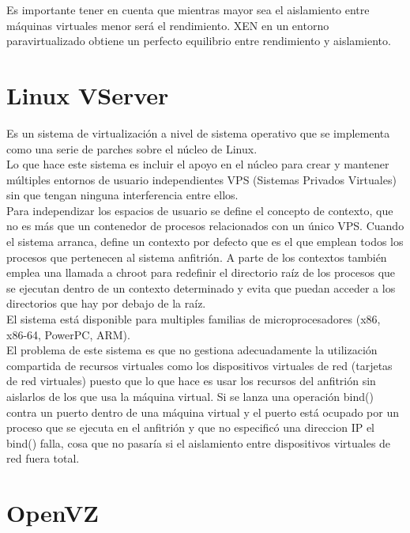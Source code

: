 \documentclass[10pt,a4paper,spanish]{report}
\begin{document}
  \noindent
  Es importante tener en cuenta que mientras mayor sea el aislamiento entre máquinas virtuales menor será el rendimiento. XEN en un entorno paravirtualizado obtiene un perfecto equilibrio entre rendimiento y aislamiento.

  \newpage
  \section{Linux VServer}

  \noindent
  Es un sistema de virtualización a nivel de sistema operativo que se implementa como una serie de parches sobre el núcleo de Linux. \\

  \noindent
  Lo que hace este sistema es incluir el apoyo en el núcleo para crear y mantener múltiples entornos de usuario independientes VPS (Sistemas Privados Virtuales) sin que tengan ninguna interferencia entre ellos. \\

  \noindent
  Para independizar los espacios de usuario se define el concepto de contexto, que no es más que un contenedor de procesos relacionados con un único VPS. Cuando el sistema arranca, define un contexto por defecto que es el que emplean todos los procesos que pertenecen al sistema anfitrión. A parte de los contextos también emplea una llamada a chroot para redefinir el directorio raíz de los procesos que se ejecutan dentro de un contexto determinado y evita que puedan acceder a los directorios que hay por debajo de la raíz. \\

  \noindent
  El sistema está disponible para multiples familias de microprocesadores (x86, x86-64, PowerPC, ARM). \\

  \noindent
  El problema de este sistema es que no gestiona adecuadamente la utilización compartida de recursos virtuales como los dispositivos virtuales de red (tarjetas de red virtuales) puesto que lo que hace es usar los recursos del anfitrión sin aislarlos de los que usa la máquina virtual. Si se lanza una operación bind() contra un puerto dentro de una máquina virtual y el puerto está ocupado por un proceso que se ejecuta en el anfitrión y que no especificó una direccion IP el bind() falla, cosa que no pasaría si el aislamiento entre dispositivos virtuales de red fuera total.

  \section{OpenVZ}
\end{document}
